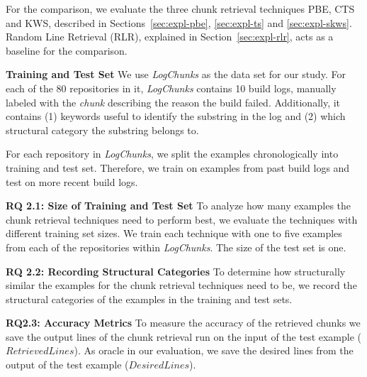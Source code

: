 For the comparison, we evaluate the three chunk retrieval techniques
PBE, CTS and KWS, described in Sections~\ref{sec:expl-pbe},
\ref{sec:expl-ts} and \ref{sec:expl-skws}. Random Line Retrieval
(RLR), explained in Section~\ref{sec:expl-rlr}, acts as a baseline for
the comparison.

\noindent
\textbf{Training and Test Set}
We use \emph{LogChunks} as the data set for our study. For each of the
80 repositories in it, \emph{LogChunks} contains 10 build logs,
manually labeled with the \emph{chunk} describing the
reason the build failed. Additionally, it contains (1) keywords useful
to identify the substring in the log  and (2) which structural category
the substring belongs to.

For each repository in \emph{LogChunks}, we split the examples
chronologically into training and test set. Therefore, we train on
examples from past build logs and test on more recent build logs.

\noindent %
\textbf{RQ 2.1: Size of Training and Test Set}
To analyze how many examples the chunk retrieval techniques need to
perform best, we evaluate the techniques with different training set
sizes. We train each technique with one to five examples from each of
the repositories within \emph{LogChunks}. The size of the test set is
one.

\noindent
\textbf{RQ 2.2: Recording Structural Categories}
To determine how structurally similar the examples for the chunk
retrieval techniques need to be, we record the structural categories
of the examples in the training and test sets.

\noindent
\textbf{RQ2.3: Accuracy Metrics}
To measure the accuracy of the retrieved chunks we save the output
lines of the chunk retrieval run on the input of the test example
($\mathit{RetrievedLines}$). As oracle in our evaluation, we save the
desired lines from the output of the test example
($\mathit{DesiredLines}$).

